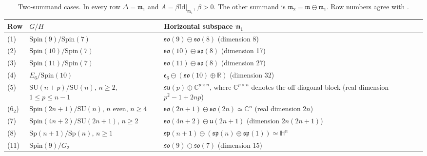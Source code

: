 \documentclass[12pt]{amsart}
\theoremstyle{plain}
\theoremstyle{definition}
\theoremstyle{remark}
\newcommand{\alg}[1]{\mathfrak{#1}}
\newcommand{\RR}{\mathbb{R}}
\newcommand{\CC}{\mathbb{C}}
\newcommand{\HH}{\mathbb{H}}
\newcommand{\Idm}{\mathrm{Id}}
\begin{document}
\begin{table}[htbp]
\centering
\caption{Two-summand cases. In every row $\Delta=\alg{m}_1$ and $A=\beta\Idm|_{\alg{m}_1}$,
$\beta>0$. The other summand is $\alg{m}_2=\alg{m}\ominus\alg{m}_1$. Row numbers agree with
\cite[Table~1]{ChenNN}.}
\label{tab:two}
\begin{tabular}{@{}l l p{2.7in}@{}}
\toprule
Row & $G/H$ & Horizontal subspace $\alg{m}_1$\\
\midrule
(1) & $\mathrm{Spin}(9)/\mathrm{Spin}(7)$ & $\alg{so}(9)\ominus\alg{so}(8)$ (dimension 8)\\
(2) & $\mathrm{Spin}(10)/\mathrm{Spin}(7)$ & $\alg{so}(10)\ominus\alg{so}(8)$ (dimension 17)\\
(3) & $\mathrm{Spin}(11)/\mathrm{Spin}(7)$ & $\alg{so}(11)\ominus\alg{so}(8)$ (dimension 27)\\
(4) & $E_6/\mathrm{Spin}(10)$ & $\alg{e}_6\ominus(\alg{so}(10)\oplus\RR)$ (dimension 32)\\
(5) & $\mathrm{SU}(n{+}p)/\mathrm{SU}(n)$, $n\ge2$, $1\le p\le n-1$ &
$\alg{su}(p)\oplus\CC^{p\times n}$, where $\CC^{p\times n}$ denotes the off-diagonal block (real
dimension $p^2-1+2np$)\\
(6$_2$) & $\mathrm{Spin}(2n{+}1)/\mathrm{SU}(n)$, $n$ even, $n\ge4$ &
$\alg{so}(2n+1)\ominus\alg{so}(2n)\simeq\CC^n$ (real dimension $2n$)\\
(7) & $\mathrm{Spin}(4n{+}2)/\mathrm{SU}(2n{+}1)$, $n\ge2$ &
$\alg{so}(4n+2)\ominus\alg{u}(2n+1)$ (dimension $2n(2n+1)$)\\
(8) & $\mathrm{Sp}(n{+}1)/\mathrm{Sp}(n)$, $n\ge1$ &
$\alg{sp}(n+1)\ominus(\alg{sp}(n)\oplus\alg{sp}(1))\simeq\HH^n$\\
(11) & $\mathrm{Spin}(9)/G_2$ & $\alg{so}(9)\ominus\alg{so}(7)$ (dimension 15)\\
\bottomrule
\end{tabular}
\end{table}
\end{document}
